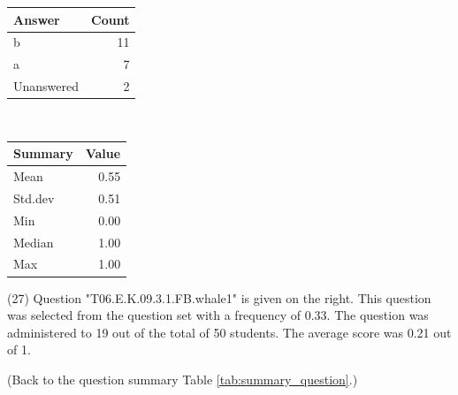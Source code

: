 \documentclass[12pt,english,nohyper]{tufte-handout}\usepackage[]{graphicx}\usepackage[]{color}
\begin{document}
\begin{center}%
\begin{tabular}{lr}
  \hline
Answer & Count \\ 
  \hline
b &  11 \\ 
  a &   7 \\ 
  Unanswered &   2 \\ 
   \hline
\end{tabular}
~~~~~~~~%
\begin{tabular}{lr}
  \hline
Summary & Value \\ 
  \hline
Mean & 0.55 \\ 
  Std.dev & 0.51 \\ 
  Min & 0.00 \\ 
  Median & 1.00 \\ 
  Max & 1.00 \\ 
   \hline
\end{tabular}
\end{center}\newpage{} (27) Question "T06.E.K.09.3.1.FB.whale1" is given on the right. This question was selected from the question set with a frequency of 0.33. The question was administered to 19 out of the total of 50 students. The average score was 0.21 out of 1.

 (Back to the question summary Table \ref{tab:summary_question}.)
\end{document}
